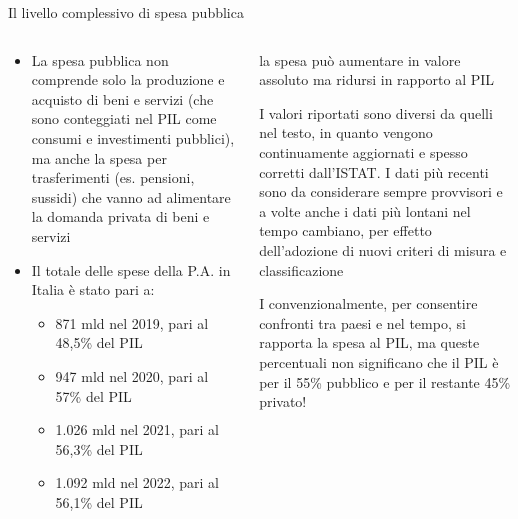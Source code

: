 \documentclass[11pt,italian]{beamer}
\begin{document}
\begin{frame}{Il livello complessivo di spesa pubblica}
\begin{columns}
\begin{column}{.6\columnwidth}
\begin{itemize}
\item La spesa pubblica non comprende solo la produzione e acquisto di beni e
servizi (che sono conteggiati nel PIL come consumi e investimenti pubblici),
ma anche la spesa per trasferimenti (es. pensioni, sussidi) che vanno ad
alimentare la domanda privata di beni e servizi

\item Il totale delle spese della P.A. in Italia è stato pari a:
\begin{itemize}
\item 871 mld nel 2019, pari al 48,5\% del PIL
\item 947 mld nel 2020, pari al 57\% del PIL
\item 1.026 mld nel 2021, pari al 56,3\% del PIL
\item 1.092 mld nel 2022, pari al 56,1\% del PIL
\end{itemize}
\end{itemize}
\end{column}

\begin{column}{.4\columnwidth}
\begin{block}{}
\scriptsize
la spesa può aumentare in valore assoluto ma ridursi in rapporto al PIL
\end{block}

\begin{block}{}
\scriptsize
I valori riportati sono diversi da quelli nel testo, in quanto vengono continuamente aggiornati e spesso corretti dall’ISTAT. 
I dati più recenti sono da considerare sempre provvisori e a volte anche i dati più lontani  nel tempo cambiano, per effetto dell’adozione di nuovi criteri di misura e classificazione
\end{block}

\begin{block}{}
\scriptsize
I convenzionalmente, per consentire confronti tra paesi e nel tempo, si rapporta la spesa al PIL, ma queste percentuali \alert{non significano} che il PIL è per il 55\% pubblico e per il restante 45\% privato!
\end{block}
\end{column}
\end{columns}
\end{frame}
\end{document}
